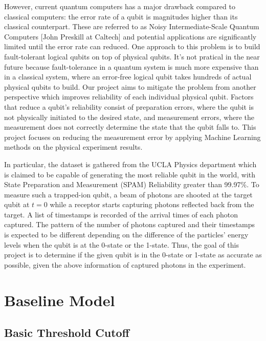 \documentclass[letterpaper,twocolumn,10pt]{article}
\begin{document}
However, current quantum computers has a major drawback compared to classical computers: the error rate of a qubit is magnitudes higher than its classical counterpart. These are referred to as Noisy Intermediate-Scale Quantum Computers [John Preskill at Caltech] and potential applications are significantly limited until the error rate can reduced. One approach to this problem is to build fault-tolerant logical qubits on top of physical qubits. It's not pratical in the near future because fault-tolerance in a quantum system is much more expensive than in a classical system, where an error-free logical qubit takes hundreds of actual physical qubits to build. Our project aims to mitigate the problem from another perspective which improves reliability of each individual physical qubit. Factors that reduce a qubit's reliability consist of preparation errors, where the qubit is not physically initiated to the desired state, and measurement errors, where the measurement does not correctly determine the state that the qubit falls to. This project focuses on reducing the measurement error by applying Machine Learning methods on the physical experiment results.

In particular, the dataset is gathered from the UCLA Physics department which is claimed to be capable of generating the most reliable qubit in the world, with State Preparation and Measurement (SPAM) Reliability greater than 99.97\%. To measure such a trapped-ion qubit, a beam of photons are shooted at the target qubit at $t = 0$ while a receptor starts capturing photons reflected back from the target. A list of timestamps is recorded of the arrival times of each photon captured. The pattern of the number of photons captured and their timestamps is expected to be different depending on the difference of the particles' energy levels when the qubit is at the 0-state or the 1-state. Thus, the goal of this project is to determine if the given qubit is in the 0-state or 1-state as accurate as possible, given the above information of captured photons in the experiment.

\section{Baseline Model}

\subsection{Basic Threshold Cutoff}
\end{document}
